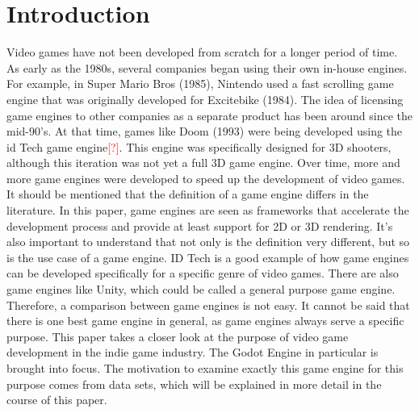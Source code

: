 \section{Introduction}
Video games have not been developed from scratch for a longer period of time.
As early as the 1980s, several companies began using their own in-house engines.
For example, in Super Mario Bros (1985), Nintendo used a fast scrolling game engine that was originally developed for Excitebike (1984)\cite{history-digital-games}.
The idea of licensing game engines to other companies as a separate product has been around since the mid-90's.
At that time, games like Doom (1993) were being developed using the id Tech game engine\textcolor{red}{[?]}.
This engine was specifically designed for 3D shooters, although this iteration was not yet a full 3D game engine.
Over time, more and more game engines were developed to speed up the development of video games.
It should be mentioned that the definition of a game engine differs in the literature.
In this paper, game engines are seen as frameworks that accelerate the development process and provide at least support for 2D or 3D rendering.
It's also important to understand that not only is the definition very different, but so is the use case of a game engine.
ID Tech is a good example of how game engines can be developed specifically for a specific genre of video games.
There are also game engines like Unity, which could be called a general purpose game engine.
Therefore, a comparison between game engines is not easy.
It cannot be said that there is one best game engine in general, as game engines always serve a specific purpose.
This paper takes a closer look at the purpose of video game development in the indie game industry.
The Godot Engine in particular is brought into focus.
The motivation to examine exactly this game engine for this purpose comes from data sets, which will be explained in more detail in the course of this paper.
